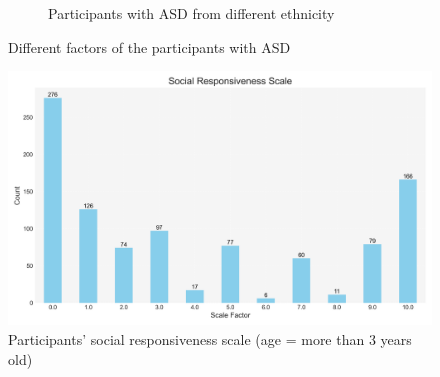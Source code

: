 \documentclass{article}
\begin{document}
\begin{figure}[H]
\begin{subfigure}{0.65\textwidth}
                \caption{Participants with ASD from different ethnicity}
                \vspace{1em}
                \label{fig:ethnicity-pie}
            \end{subfigure}
            \caption{Different factors of the participants with ASD}
        \end{figure}

        \begin{figure}[H]
            \centering
            \includegraphics[width=\textwidth]{images/Social Responsiveness Scale(asd).png}
            \caption{Participants' social responsiveness scale (age = more than 3 years old)}
            \label{fig:social-response}
        \end{figure}
\end{document}

